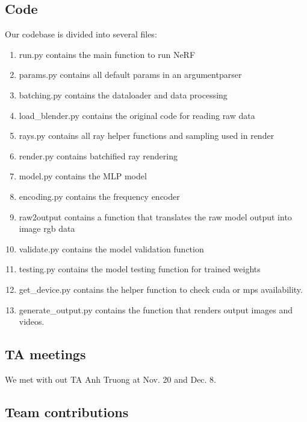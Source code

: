\subsection*{Code}
Our codebase is divided into several files:
\begin{enumerate}
    \itemsep0em
    \item run.py contains the main function to run NeRF
    \item params.py contains all default params in an argumentparser
    \item batching.py contains the dataloader and data processing
    \item load\_blender.py contains the original code for reading raw data
    \item rays.py contains all ray helper functions and sampling used in render
    \item render.py contains batchified ray rendering
    \item model.py contains the MLP model
    \item encoding.py contains the frequency encoder
    \item raw2output contains a function that translates the raw model output into image rgb data
    \item validate.py contains the model validation function
    \item testing.py contains the model testing function for trained weights
    \item get\_device.py contains the helper function to check cuda or mps availability.
    \item generate\_output.py contains the function that renders output images and videos.
\end{enumerate}



\subsection*{TA meetings}
We met with out TA Anh Truong at Nov. 20 and Dec. 8.

\subsection*{Team contributions}

